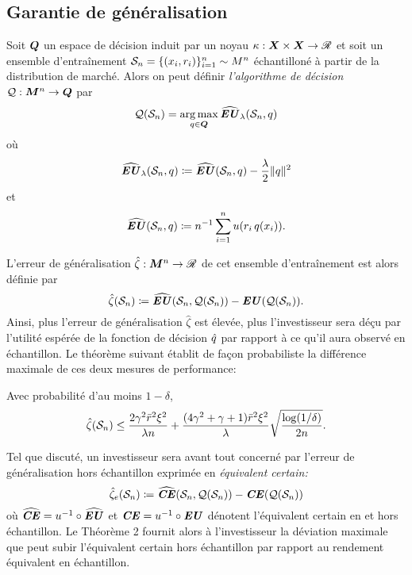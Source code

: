 \subsection{Garantie de généralisation}
\label{b:gen}


Soit $\Q$ un espace de décision induit par un noyau $\kappa : \X \times \X \to \Re$ et soit un ensemble
d'entraînement $\S_n = \{(x_i,r_i)\}_{i=1}^n \sim M^n$ échantilloné à partir de la
distribution de marché. Alors on peut définir \textit{l'algorithme de décision}
$\alg:\M^n \to \Q$ par
\begin{equation}
  \label{b:basic}
  \alg(\S_n) = \argmax_{q \in \Q} \hEU_\lambda(\S_n,q)
\end{equation}
où
\begin{equation}
  \hEU_\lambda(\S_n,q) \coloneq \hEU(\S_n,q) - \frac{\lambda}{2}\|q\|^2
\end{equation}
et
\begin{equation}
  \hEU(\S_n,q) \coloneq n^{-1}\sumi u(r_i\,q(x_i)).
\end{equation}

L'erreur de généralisation $\hat\zeta:\M^n \to \Re$ de cet ensemble d'entraînement est alors définie
par
\begin{equation}
  \hat\zeta(\S_n) \coloneq \hEU(\S_n,\alg(\S_n)) - \EU(\alg(\S_n)).
\end{equation}
Ainsi, plus l'erreur de généralisation $\hat\zeta$ est élevée, plus l'investisseur sera déçu
par l'utilité espérée de la fonction de décision $\qh$ par rapport à ce qu'il aura observé
en échantillon. Le théorème suivant établit de façon probabiliste la différence maximale
de ces deux mesures de performance:

\begin{thm}
  \label{thm1}
  Avec probabilité d'au moins $1-\delta$, 
  \begin{equation}
    \hat\zeta(\S_n) \leq \frac{2\gamma^2\rmax^2\xi^2}{\lambda n} + \frac{(4\gamma^2 + \gamma +
      1)\rmax^2\xi^2}{\lambda}\sqrt{\frac{\log(1/\delta)}{2n}}.
  \end{equation}
\end{thm}

Tel que discuté, un investisseur sera avant tout concerné par l'erreur de généralisation
hors échantillon exprimée en \textit{équivalent certain:}
\begin{equation}
  \hat\zeta_e(\S_n) \coloneq \hCE(\S_n,\alg(\S_n)) - \CE(\alg(\S_n))
\end{equation}
où $\hCE = u^{-1} \circ \hEU$ et $\CE = u^{-1} \circ \EU$ dénotent l'équivalent certain en et hors
échantillon. Le Théorème 2 fournit alors à l'investisseur la déviation maximale que peut
subir l'équivalent certain hors échantillon par rapport au rendement équivalent en
échantillon.

